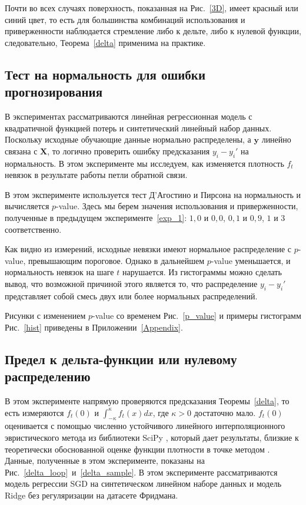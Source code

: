     Почти во всех случаях поверхность, показанная на Рис.~\ref{3D}, имеет красный или синий цвет, то есть для большинства комбинаций использования и приверженности наблюдается стремление либо к дельте, либо к нулевой функции, следовательно, Теорема~\ref{delta} применима на практике.

\subsection{Тест на нормальность для ошибки прогнозирования} \label{exp_2}

    В экспериментах рассматриваются линейная регрессионная модель с квадратичной функцией потерь и синтетический линейный набор данных. Поскольку исходные обучающие данные нормально распределены, а $\mathbf{y}$ линейно связана с $\textbf{X}$, то логично проверить ошибку предсказания $y_i - y_i'$ на нормальность. В этом эксперименте мы исследуем, как изменяется плотность $f_t$ невязок в результате работы петли обратной связи.
        
    В этом эксперименте используется тест Д'Агостино и Пирсона на нормальность и вычисляется $p$-value. Здесь мы берем значения использования и приверженности, полученные в предыдущем эксперименте~\ref{exp_1}: $1,0$ и $0,0$, $0,1$ и $0,9$, $1$ и $3$ соответственно. 

    Как видно из измерений, исходные невязки имеют нормальное распределение с $p$-value, превышающим пороговое. Однако в дальнейшем $p$-value уменьшается, и нормальность невязок на шаге $t$ нарушается. 
    Из гистограммы можно сделать вывод, что возможной причиной этого является то, что распределение $y_i - y_i'$ представляет собой смесь двух или более нормальных распределений. 

    Рисунки с изменением $p$-value со временем Рис.~\ref{p_value} и примеры гистограмм Рис.~\ref{hist} приведены в Приложении~\ref{Appendix}.

\subsection{Предел к дельта-функции или нулевому распределению} \label{exp_3}

    В этом эксперименте напрямую проверяются предсказания Теоремы~\ref{delta}, то есть измеряются $f_t(0)$ и $\int_{-\kappa}^{\kappa}f_t(x)dx$, где $\kappa > 0$ достаточно мало. $f_t(0)$ оценивается с помощью численно устойчивого линейного интерполяционного эвристического метода из библиотеки SciPy \citep{virtanen2020SciPy}, который дает результаты, близкие к теоретически обоснованной оценке функции плотности в точке методом \citep{silverman1986density}.
    Данные, полученные в этом эксперименте, показаны на Рис.~\ref{delta_loop}~и~\ref{delta_sample}. В этом эксперименте рассматриваются модель регрессии SGD на синтетическом линейном наборе данных и модель Ridge без регуляризации на датасете Фридмана.

